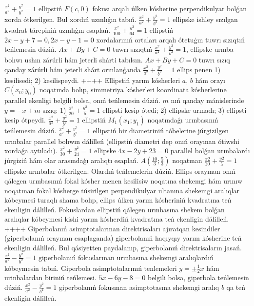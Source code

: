 $\frac{x^2}{a^2}+\frac{y^2}{b^2}=1$ ellipstiń $F(c, 0)$ fokusı arqalı úlken kósherine perpendikulyar bolǵan xorda ótkerilgen. Bul xordıń uzınlıǵın tabıń.
$\frac{x^2}{a^2}+\frac{y^2}{b^2}=1$ ellipske ishley sızılgan kvadrat tárepiniń uzınlıǵın esaplań.
$\frac{x^2}{100}+\frac{y^2}{64}=1$ ellipstiń $2 x-y+7=0,2 x-y-1=0$ xordalarınıń ortaları arqalı ótetuģın tuwrı sızıqtıń teńlemesin dúziń.
$A x+B y+C=0$ tuwrı sızıqtıń $\frac{x^2}{a^2}+\frac{y^2}{b^2}=1$, ellipske urınba bolıwı ushın zárúrli hám jeterli shárti tabılsın.
$A x+B y+C=0$ tuwrı sızıq qanday zárúrli hám jeterli shárt orınlanǵanda $\frac{x^2}{a^2}+\frac{y^2}{b^2}=1$ ellips penen 1) kesilisedi; 2) kesilispeydi.
++++
Ellipstiń yarım kósherleri $a$, $b$ hám orayı $C\left(x_0; y_0\right) $ noqatında bolıp, simmetriya kósherleri koordinata kósherlerine parallel ekenligi belgili bolsa, onıń teńlemesin dúziń.
$m$ nıń qanday mánislerinde $y=-x+m$ sızıq: 1) $\frac{x^2}{20}+\frac{y^2}{5}=1$ ellipsti kesip ótedi; 2) ellipske urınadı; 3) ellipsti kesip ótpeydi.
$\frac{x^2}{a^2}+\frac{y^2}{b^2}=1$ ellipstiń $M_1 (x_1; y_1) $ noqatındaǵı urınbasınıń teńlemesin dúziń.
$\frac{x^2}{a^2}+\frac{y^2}{b^2}=1$ ellipstiń bir diametriniń tóbelerine júrgizilgen urınbalar parallel bolıwın dálilleń (ellipstiń diametri dep onıń orayınan ótiwshi xordaǵa aytıladı).
$\frac{x^2}{30}+\frac{y^2}{24}=1$ ellipske $4x-2y+23=0$ parallel bolǵan urınbalardı júrgiziń hám olar arasındaģı aralıqtı esaplań.
$A\left(\frac{10}{3}; \frac{5}{3}\right)$ noqatınan $\frac{x2}{20}+\frac{y2}{5}=1$ ellipske urınbalar ótkerilgen. Olardıń teńlemelerin dúziń.
Ellips orayınan onıń qálegen urınbasınıń fokal kósher menen kesilisiw noqatına shekemgi hám urınıw noqatınan fokal kósherge túsirilgen perpendikulyar ultanına shekemgi aralıqlar kóbeymesi turaqlı shama bolıp, ellips úlken yarım kósheriniń kvadratına teń ekenligin dálilleń.
Fokuslardan ellipstiń qálegen urınbasına shekem bolǵan aralıqlar kóbeymesi kishi yarım kósherdiń kvadratına teń ekenligin dálilleń.
++++
Giperbolanıń asimptotalarınan direktrisaları ajıratqan kesindiler (giperbolanıń orayınan esaplaganda) giperbolanıń haqıyqıy yarım kósherine teń ekenligin dálilleń. Bul qásiyetten paydalanıp, giperbolanıń direktrisaların jasań.
$\frac{x^2}{a^2}-\frac{y^2}{b^2}=1$ giperbolanıń fokuslarınan urınbasına shekemgi aralıqlardıń kóbeymesin tabıń.
Giperbola asimptotalarınıń tenlemeleri $y= \pm \frac{1}{2} x$ hám urinbalardan biriniń teńlemesi. $5 x-6 y-8=0$ belgili bolsa, giperbola teńlemesin dúziń.
$\frac{x^2}{a^2}-\frac{y^2}{b^2}=1$ giperbolanıń fokusınan asimptotasına shekemgi aralıq $b$ qa teń ekenligin dálilleń.
